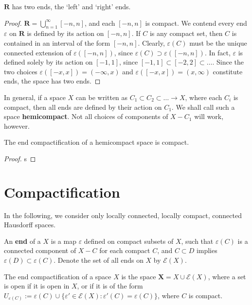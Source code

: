 \begin{lemma}
    $\mathbf{R}$ has two ends, the `left' and `right' ends.
\end{lemma}
\begin{proof}
    $\mathbf{R} = \bigcup_{n = 1}^\infty [-n, n]$, and each $[-n, n]$ is compact. We contend every end $\varepsilon$ on $\mathbf{R}$ is defined by its action on $[-n, n]$. If $C$ is any compact set, then $C$ is contained in an interval of the form $[-n, n]$. Clearly, $\varepsilon(C)$ must be the unique connected extension of $\varepsilon([-n, n])$, since $\varepsilon(C) \supset \varepsilon([-n,n])$. In fact, $\varepsilon$ is defined solely by its action on $[-1,1]$, since $[-1,1] \subset [-2,2] \subset \dots$. Since the two choices $\varepsilon([-x,x]) = (-\infty, x)$ and $\varepsilon([-x,x]) = (x,\infty)$ constitute ends, the space has two ends.
\end{proof}

In general, if a space $X$ can be written as $C_1 \subset C_2 \subset \dots \to X$, where each $C_i$ is compact, then all ends are defined by their action on $C_1$. We shall call such a space {\bf hemicompact}. Not all choices of components of $X - C_1$ will work, however.

\begin{lemma}
    The end compactification of a hemicompact space is compact.
\end{lemma}
\begin{proof}
    s
\end{proof}

\chapter{Compactification}

In the following, we consider only locally connected, locally compact, connected Hausdorff spaces.

\begin{definition}
    An {\bf end} of a $X$ is a map $\varepsilon$ defined on compact subsets of $X$, such that $\varepsilon(C)$ is a connected component of $X - C$ for each compact $C$, and $C \subset D$ implies $\varepsilon(D) \subset \varepsilon(C)$. Denote the set of all ends on $X$ by $\mathcal{E}(X)$.
\end{definition}

\begin{definition}
    The end compactification of a space $X$ is the space $\mathbf{X} = X \cup \mathcal{E}(X)$, where a set is open if it is open in $X$, or if it is of the form $U_{\varepsilon(C)} := \varepsilon(C) \cup \{ \varepsilon' \in \mathcal{E}(X) : \varepsilon'(C) = \varepsilon(C) \}$, where $C$ is compact.
\end{definition}

